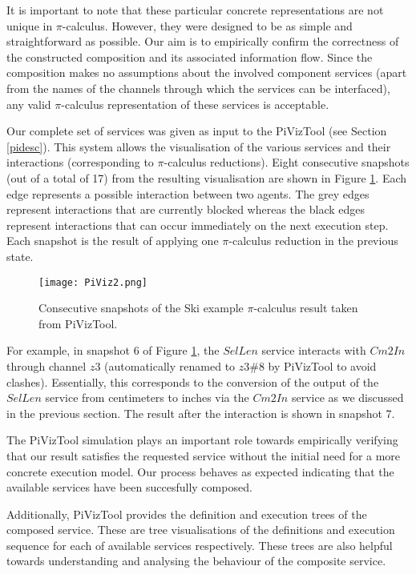 \documentclass[copyright,creativecommons]{eptcs}
\begin{document}
It is important to note that these particular concrete representations are not unique in $\pi$-calculus. However, they were designed to be as simple and straightforward as possible. Our aim is to empirically confirm the correctness of the constructed composition and its associated information flow. Since the composition makes no assumptions about the involved component services (apart from the names of the channels through which the services can be interfaced), any valid $\pi$-calculus representation of these services is acceptable. 

Our complete set of services was given as input to the PiVizTool (see Section \ref{pidesc}). This system allows the visualisation of the various services and their interactions (corresponding to $\pi$-calculus reductions). Eight consecutive snapshots (out of a total of 17) from the resulting visualisation are shown in Figure \ref{fig:PiViz}. Each edge represents a possible interaction between two agents. The grey edges represent interactions that are currently blocked whereas the black edges represent interactions that can occur immediately on the next execution step. Each snapshot is the result of applying one $\pi$-calculus reduction in the previous state.

\begin{figure}[htbp]
\centering
	\texttt{[image: PiViz2.png]}
	\caption{Consecutive snapshots of the Ski example $\pi$-calculus result taken from PiVizTool. }
	\label{fig:PiViz}
\end{figure}

For example, in snapshot 6 of Figure \ref{fig:PiViz}, the $SelLen$ service interacts with $Cm2In$ through channel $z3$ (automatically renamed to $z3\#8$ by PiVizTool to avoid clashes). Essentially, this corresponds to the conversion of the output of the $SelLen$ service from centimeters to inches via the $Cm2In$ service as we discussed in the previous section. The result after the interaction is shown in snapshot 7.

The PiVizTool simulation plays an important role towards empirically verifying that our result satisfies the requested service without the initial need for a more concrete execution model. Our process behaves as expected indicating that the available services have been succesfully composed.

Additionally, PiVizTool provides the definition and execution trees of the composed service. These are tree visualisations of the definitions and execution sequence for each of available services respectively. These trees are also helpful towards understanding and analysing the behaviour of the composite service.
\end{document}
